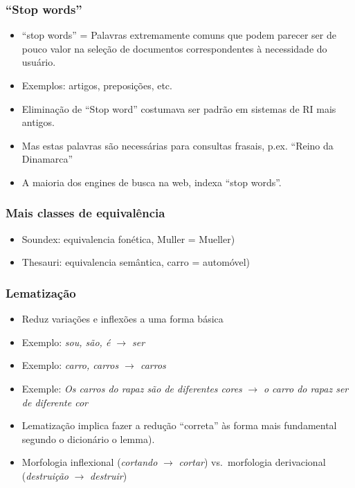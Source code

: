 \documentclass[compress]{beamer}
\begin{document}
\begin{frame}
\frametitle{``Stop words''}
\begin{itemize}[<+->]
\item ``stop words'' = Palavras extremamente comuns que podem parecer ser 
 de pouco valor na seleção de documentos correspondentes à necessidade do 
usuário.
\item Exemplos: artigos, preposições, etc.

\item Eliminação de ``Stop word'' costumava ser padrão em sistemas de RI mais 
antigos.
\item Mas estas palavras são necessárias para consultas frasais,
  p.ex. ``Reino da Dinamarca''
\item A maioria dos engines de busca na web, indexa ``stop words''.
\end{itemize}
\end{frame}

\begin{frame}
\frametitle{Mais classes de equivalência}
\begin{itemize}[<+->]
\item Soundex: equivalencia fonética, Muller = Mueller)
\item Thesauri: equivalencia semântica, carro = automóvel)
\end{itemize}
\end{frame}


\begin{frame}
\frametitle{Lematização}
\begin{itemize}[<+->]
\item Reduz variações e inflexões a uma forma básica
\item Exemplo: \emph{sou, são, é $\rightarrow$ ser}
\item Exemplo: \emph{carro, carros $\rightarrow$ carros}
\item Exemple: \emph{Os carros do rapaz são de diferentes cores}
  $\rightarrow$ \emph{o carro do rapaz ser de diferente cor}
\item Lematização implica fazer a redução ``correta'' às forma mais fundamental 
segundo o dicionário {o \color{blue}lemma}).
\item Morfologia inflexional (\emph{cortando} 
$\rightarrow$
  \emph{cortar}) vs.\ morfologia derivacional (\emph{destruição} 
$\rightarrow$ \emph{destruir})
\end{itemize}
\end{frame}
\end{document}
